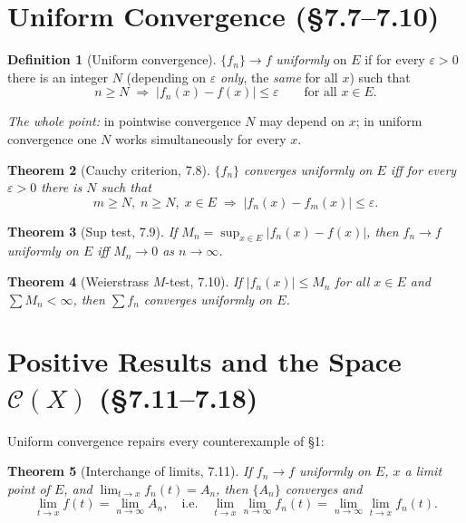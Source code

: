 \documentclass[11pt]{article}
\theoremstyle{definition}
\newtheorem{definition}{Definition}[section]
\theoremstyle{plain}
\newtheorem{theorem}[definition]{Theorem}
\newcommand{\CX}{\mathscr{C}}      %
\newcommand{\abs}[1]{\left\lvert #1 \right\rvert}
\renewcommand{\to}{\longrightarrow}
\begin{document}
\section{Uniform Convergence (\S7.7--7.10)}

\begin{definition}[Uniform convergence]
$\{f_n\}\to f$ \emph{uniformly} on $E$ if for every $\varepsilon>0$ there is an
integer $N$ (depending on $\varepsilon$ \emph{only}, the \emph{same} for all $x$)
such that
\[
   n\ge N \;\Longrightarrow\; \abs{f_n(x)-f(x)}\le \varepsilon
   \qquad\text{for all } x\in E.
\]
\end{definition}

\noindent\emph{The whole point:} in pointwise convergence $N$ may depend on $x$;
in uniform convergence one $N$ works simultaneously for every $x$.

\begin{theorem}[Cauchy criterion, 7.8]
$\{f_n\}$ converges uniformly on $E$ iff for every $\varepsilon>0$ there is $N$
such that
\[
   m\ge N,\; n\ge N,\; x\in E \;\Longrightarrow\; \abs{f_n(x)-f_m(x)}\le\varepsilon.
\]
\end{theorem}

\begin{theorem}[Sup test, 7.9]
If $M_n=\displaystyle\sup_{x\in E}\abs{f_n(x)-f(x)}$, then
$f_n\to f$ uniformly on $E$ iff $M_n\to 0$ as $n\to\infty$.
\end{theorem}

\begin{theorem}[Weierstrass $M$-test, 7.10]
If $\abs{f_n(x)}\le M_n$ for all $x\in E$ and $\displaystyle\sum M_n<\infty$, then
$\displaystyle\sum f_n$ converges uniformly on $E$.
\end{theorem}

\section{Positive Results and the Space $\CX(X)$ (\S7.11--7.18)}

Uniform convergence repairs every counterexample of \S1:

\begin{theorem}[Interchange of limits, 7.11]
If $f_n\to f$ uniformly on $E$, $x$ a limit point of $E$, and
$\lim_{t\to x}f_n(t)=A_n$, then $\{A_n\}$ converges and
\[
   \lim_{t\to x} f(t)=\lim_{n\to\infty} A_n,
   \quad\text{i.e.}\quad
   \lim_{t\to x}\lim_{n\to\infty} f_n(t)=\lim_{n\to\infty}\lim_{t\to x} f_n(t).
\]
\end{theorem}
\end{document}
